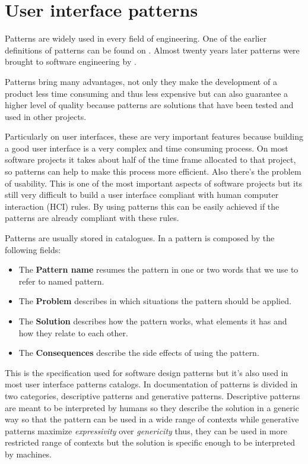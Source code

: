 \section{User interface patterns}
\label{section:user_interface_patterns}

Patterns are widely used in every field of engineering. One of the earlier definitions of patterns can be found on \cite{A_Pattern_Language_Towns_Buildings_Construction}. Almost twenty years later patterns were brought to software engineering by \cite{Design_Patterns}.

Patterns bring many advantages, not only they make the development of a product less time consuming and thus less expensive but can also guarantee a higher level of quality because patterns are solutions that have been tested and used in other projects.

Particularly on user interfaces, these are very important features because building a good user interface is a very complex and time consuming process. On most software projects it takes about half of the time frame allocated to that project, so patterns can help to make this process more efficient. Also there's the problem of usability. This is one of the most important aspects of software projects but its still very difficult to build a user interface compliant with human computer interaction (HCI) rules. By using patterns this can be easily achieved if the patterns are already compliant with these rules.

Patterns are usually stored in catalogues. In \cite{Design_Patterns} a pattern is composed by the following fields:
\begin{itemize}
\item The \textbf{Pattern name} resumes the pattern in one or two words that we use to refer to named pattern.
\item The \textbf{Problem} describes in which situations the pattern should be applied.
\item The \textbf{Solution} describes how the pattern works, what elements it has and how they relate to each other.
\item The \textbf{Consequences} describe the side effects of using the pattern.
\end{itemize}
This is the specification used for software design patterns but it's also used in most user interface patterns catalogs.
In \cite{Generative_pattern-based_design_of_user_interfaces} documentation of patterns is divided in two categories, descriptive patterns and generative patterns. Descriptive patterns are meant to be interpreted by humans so they describe the solution in a generic way so that the pattern can be used in a wide range of contexts while generative patterns maximize \textit{expressivity} over \textit{genericity} thus, they can be used in more restricted range of contexts but the solution is specific enough to be interpreted by machines. 

